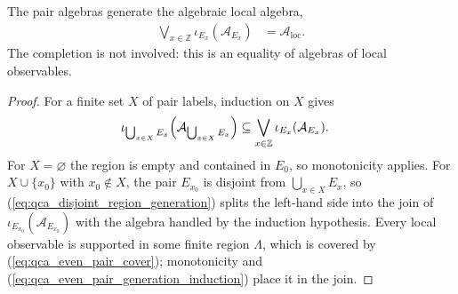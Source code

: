 \begin{lemma}
    \label{thm:qca_even_pair_algebraic_generation}
    \leanok
    The pair algebras generate the algebraic local algebra,
    \begin{align}
        \bigvee_{x\in\mathbb Z}\iota_{E_x}(\mathcal A_{E_x})
         & =\mathcal A_{\mathrm{loc}}.
        \label{eq:qca_even_pair_algebraic_generation}
    \end{align}
    The completion is not involved: this is an equality of algebras of local
    observables.
\end{lemma}

\begin{proof}\leanok
    For a finite set $X$ of pair labels, induction on $X$ gives
    \begin{align}
        \iota_{\bigcup_{x\in X}E_x}
        \Bigl(\mathcal A_{\bigcup_{x\in X}E_x}\Bigr)
         & \subseteq\bigvee_{x\in\mathbb Z}
        \iota_{E_x}(\mathcal A_{E_x}).
        \label{eq:qca_even_pair_generation_induction}
    \end{align}
    For $X=\varnothing$ the region is empty and contained in $E_0$, so
    monotonicity applies.  For $X\cup\{x_0\}$ with $x_0\notin X$, the pair
    $E_{x_0}$ is disjoint from $\bigcup_{x\in X}E_x$, so
    (\ref{eq:qca_disjoint_region_generation}) splits the left-hand side into
    the join of $\iota_{E_{x_0}}(\mathcal A_{E_{x_0}})$ with the algebra
    handled by the induction hypothesis.  Every local observable is supported
    in some finite region $\Lambda$, which is covered by
    (\ref{eq:qca_even_pair_cover}); monotonicity and
    (\ref{eq:qca_even_pair_generation_induction}) place it in the join.
\end{proof}

